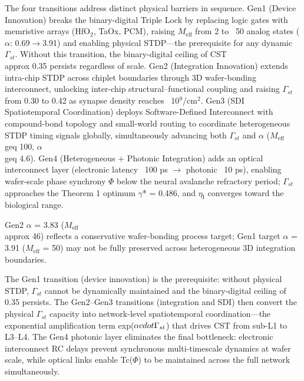 \documentclass[a4paper,12pt]{article}
\begin{document}
The four transitions address distinct physical barriers in sequence. Gen1 (Device Innovation) breaks the binary-digital Triple Lock by replacing logic gates with memristive arrays (HfO$_2$, TaOx, PCM), raising $M_{\text{eff}}$ from 2 to ~50 analog states ($\alpha$: 0.69$\rightarrow$3.91) and enabling physical STDP---the prerequisite for any dynamic $\Gamma_{st}$. Without this transition, the binary-digital ceiling of CST  \\approx  0.35 persists regardless of scale. Gen2 (Integration Innovation) extends intra-chip STDP across chiplet boundaries through 3D wafer-bonding interconnect, unlocking inter-chip structural--functional coupling and raising $\Gamma_{st}$ from 0.30 to 0.42 as synapse density reaches ~10$^9$/cm$^2$. Gen3 (SDI Spatiotemporal Coordination) deploys Software-Defined Interconnect with compound-bond topology and small-world routing to coordinate heterogeneous STDP timing signals globally, simultaneously advancing both $\Gamma_{st}$ and $\alpha$ ($M_{\text{eff}}$  \\geq  100, $\alpha$  \\geq  4.6). Gen4 (Heterogeneous + Photonic Integration) adds an optical interconnect layer (electronic latency ~100 ps $\rightarrow$ photonic ~10 ps), enabling wafer-scale phase synchrony $\Phi$ below the neural avalanche refractory period; $\Gamma_{st}$ approaches the Theorem 1 optimum $\gamma$* = 0.486, and $\eta_{\text{I}}$ converges toward the biological range.


\dag{}Gen2 $\alpha$ = 3.83 ($M_{\text{eff}}$  \\approx  46) reflects a conservative wafer-bonding process target; Gen1 target $\alpha$ = 3.91 ($M_{\text{eff}}$ = 50) may not be fully preserved across heterogeneous 3D integration boundaries.


The Gen1 transition (device innovation) is the prerequisite: without physical STDP, $\Gamma_{st}$ cannot be dynamically maintained and the binary-digital ceiling of 0.35 persists. The Gen2--Gen3 transitions (integration and SDI) then convert the physical $\Gamma_{st}$ capacity into network-level spatiotemporal coordination---the exponential amplification term exp($\alpha \\cdot \Gamma_{st}$) that drives CST from sub-L1 to L3--L4. The Gen4 photonic layer eliminates the final bottleneck: electronic interconnect RC delays prevent synchronous multi-timescale dynamics at wafer scale, while optical links enable Tc($\Phi$) to be maintained across the full network simultaneously.
\end{document}

